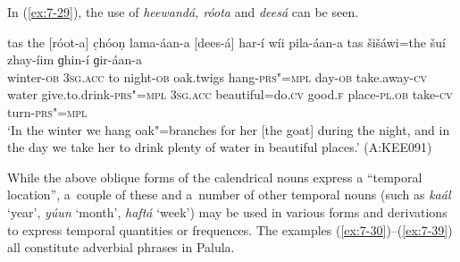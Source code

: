 In (\ref{ex:7-29}), the use of \textit{heewandá, róota} and \textit{deesá} can be seen.

\begin{exe}
\ex
\label{ex:7-29}
\gll [heewand-á] tas the [róot-a] c̣hóoṇ  lama-áan-a [dees-á] har-í wíi
pila-áan-a tas šišáwi=the šuí zhay-íim ɡhin-í ɡir-áan-a\\
winter-\textsc{ob } \textsc{3sg.acc} to night-\textsc{ob} oak.twigs  hang-\textsc{prs"=mpl} day-\textsc{ob} take.away-\textsc{cv} water give.to.drink-\textsc{prs"=mpl} \textsc{3sg.acc}  beautiful=do.\textsc{cv} good.\textsc{f} place-\textsc{pl.ob} take-\textsc{cv} turn-\textsc{prs"=mpl} \\
\glt `In the winter we hang oak"=branches for her [the goat] during the night, and in the day we take her to drink plenty of water in beautiful places.' (A:KEE091)
\end{exe}

While the above oblique forms of the calendrical nouns express a ``temporal location'', a~couple of these and a~number of other temporal nouns (such as \textit{kaál} `year', \textit{yúun} `month', \textit{haftá} `week') may be used in various forms and derivations to express temporal quantities or frequences. The examples (\ref{ex:7-30})--(\ref{ex:7-39}) all constitute adverbial phrases in Palula.

